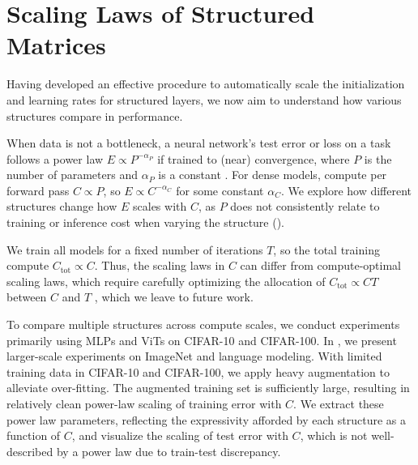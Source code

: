 \documentclass{article}
\theoremstyle{plain}
\theoremstyle{definition}
\theoremstyle{remark}
\begin{document}
\section{Scaling Laws of Structured Matrices} \label{sec:experiments}
Having developed an effective procedure to automatically scale the initialization and learning rates for structured layers, we now aim to understand how various structures compare in performance.

When data is not a bottleneck, a neural network's test error or loss on a task follows a power law $E \propto P^{-\alpha_P}$ if trained to (near) convergence, where $P$ is the number of parameters and $\alpha_P$ is a constant \citep{kaplan2020scaling, hoffmann2022training, henighan2020scaling}. For dense models, compute per forward pass $C \propto P$, so $E \propto C^{-\alpha_C}$ for some constant $\alpha_C$. We explore how different structures change how $E$ scales with $C$, as $P$ does not consistently relate to training or inference cost when varying the structure ().

We train all models for a fixed number of iterations $T$, so the total training compute $C_\mathrm{tot} \propto C$. Thus, the scaling laws in $C$ can differ from compute-optimal scaling laws, which require carefully optimizing the allocation of $C_\mathrm{tot} \propto C T$ between $C$ and $T$ \citep{kaplan2020scaling, hoffmann2022training}, which we leave to future work.

To compare multiple structures across compute scales, we conduct experiments primarily using MLPs and ViTs on CIFAR-10 and CIFAR-100. In , we present larger-scale experiments on ImageNet and language modeling. With limited training data in CIFAR-10 and CIFAR-100, we apply heavy augmentation to alleviate over-fitting. The augmented training set is sufficiently large, resulting in relatively clean power-law scaling of training error with $C$. We extract these power law parameters, reflecting the expressivity afforded by each structure as a function of $C$, and visualize the scaling of test error with $C$, which is not well-described by a power law due to train-test discrepancy.
\end{document}
